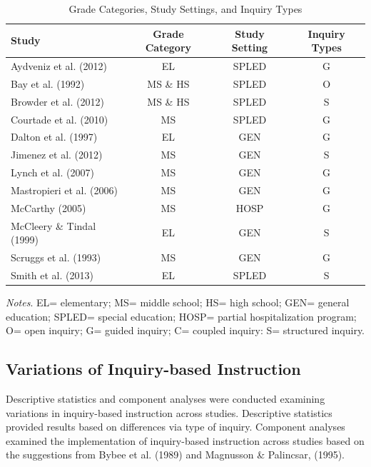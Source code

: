 \documentclass[11.5pt]{sig-alternate} %
\begin{document}
\begin{large}
\begin{table}[h]
\caption{Grade Categories, Study Settings, and Inquiry Types}
\begin{tabular}{|l|c|c|c|}
\hline
Study & Grade Category & Study Setting & Inquiry Types \\ \hline
Aydveniz et al. (2012) & EL & SPLED & G \\ \hline
Bay et al. (1992) & MS \& HS & SPLED & O \\ \hline
Browder et al. (2012) & MS \& HS & SPLED & S \\ \hline
Courtade et al. (2010) & MS & SPLED & G \\ \hline
Dalton et al. (1997) & EL & GEN & G \\ \hline
Jimenez et al. (2012) & MS & GEN & S \\ \hline
Lynch et al. (2007) & MS & GEN & G \\ \hline
Mastropieri et al. (2006) & MS & GEN & G \\ \hline
McCarthy (2005) & MS & HOSP & G \\ \hline
McCleery \& Tindal (1999) & EL & GEN & S \\ \hline
Scruggs et al. (1993) & MS & GEN & G \\ \hline
Smith et al. (2013) & EL & SPLED & S \\ \hline
\end{tabular}
\textit{Notes}. EL= elementary; MS= middle school; HS= high school; GEN= general education; SPLED= special education; HOSP= partial hospitalization program; O= open inquiry; G= guided inquiry; C= coupled inquiry: S= structured inquiry.
\end{table}

\subsection*{Variations of Inquiry-based Instruction}

Descriptive statistics and component analyses were conducted examining variations in inquiry-based instruction across studies.  Descriptive statistics provided results based on differences via type of inquiry.  Component analyses examined the implementation of inquiry-based instruction across studies based on the suggestions from Bybee et al. (1989) and Magnusson \& Palincsar, (1995).


\end{large}
\end{document}
